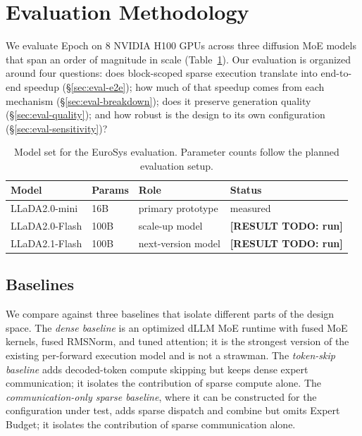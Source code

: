 \documentclass[sigconf,review,anonymous, 10pt]{acmart}
\newcommand{\resulttodo}[1]{\textcolor{todored}{\textbf{[RESULT TODO: #1]}}}
\newcommand{\sys}{Epoch}
\begin{document}
\section{Evaluation Methodology}

We evaluate \sys{} on 8 NVIDIA H100 GPUs across three diffusion MoE models that span an order of magnitude in scale (Table~\ref{tab:models}).
Our evaluation is organized around four questions: does block-scoped sparse execution translate into end-to-end speedup (\S\ref{sec:eval-e2e}); how much of that speedup comes from each mechanism (\S\ref{sec:eval-breakdown}); does it preserve generation quality (\S\ref{sec:eval-quality}); and how robust is the design to its own configuration (\S\ref{sec:eval-sensitivity})?

\begin{table}[t]
\centering
\caption{Model set for the EuroSys evaluation.  Parameter counts follow the planned evaluation setup.}
\label{tab:models}
\begin{tabular}{llll}
\toprule
Model & Params & Role & Status \\
\midrule
LLaDA2.0-mini & 16B & primary prototype & measured \\
LLaDA2.0-Flash & 100B & scale-up model & \resulttodo{run} \\
LLaDA2.1-Flash & 100B & next-version model & \resulttodo{run} \\
\bottomrule
\end{tabular}
\end{table}

\subsection{Baselines}

We compare against three baselines that isolate different parts of the design space.
The \emph{dense baseline} is an optimized dLLM MoE runtime with fused MoE kernels, fused RMSNorm, and tuned attention; it is the strongest version of the existing per-forward execution model and is not a strawman.
The \emph{token-skip baseline} adds decoded-token compute skipping but keeps dense expert communication; it isolates the contribution of sparse compute alone.
The \emph{communication-only sparse baseline}, where it can be constructed for the configuration under test, adds sparse dispatch and combine but omits Expert Budget; it isolates the contribution of sparse communication alone.
\end{document}
